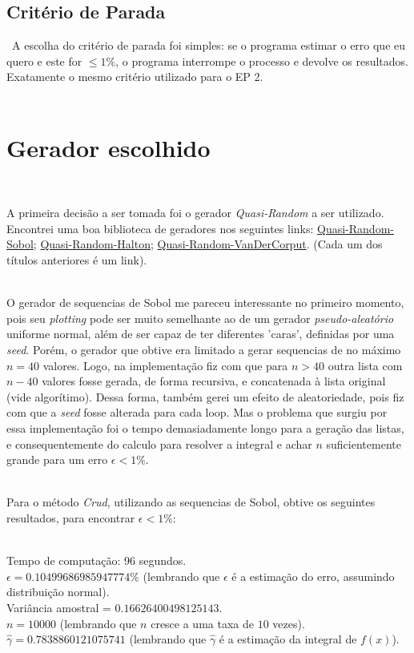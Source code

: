 \documentclass[pt12]{article}
\begin{document}
\subsection{Critério de Parada}
\ 
A escolha do critério de parada foi simples: se o programa estimar o erro que eu quero e este for $\leq 1\%$, o programa interrompe o processo e devolve os resultados. Exatamente o mesmo critério utilizado para o EP 2.\\ 
\ 

\section{Gerador escolhido}
\ 

A primeira decisão a ser tomada foi o gerador \textit{Quasi-Random} a ser utilizado. Encontrei uma boa biblioteca de geradores nos seguintes links: \href{http://people.sc.fsu.edu/~jburkardt/py_src/sobol/sobol.html}{Quasi-Random-Sobol}; \href{http://people.sc.fsu.edu/~jburkardt/py_src/halton/halton.html}{Quasi-Random-Halton}; \href{http://people.sc.fsu.edu/~jburkardt/py_src/van_der_corput/van_der_corput.html}{Quasi-Random-VanDerCorput}. (Cada um dos títulos anteriores é um link).\\
\ 

O gerador de sequencias de Sobol me pareceu interessante no primeiro momento, pois seu \textit{plotting} pode ser muito semelhante ao de um gerador \textit{pseudo-aleatório} uniforme normal, além de ser capaz de ter diferentes 'caras', definidas por uma \textit{seed}. Porém, o gerador que obtive era limitado a gerar sequencias de no máximo $n = 40$ valores. Logo, na implementação fiz com que para $n>40$ outra lista com $n-40$ valores fosse gerada, de forma recursiva, e concatenada à lista original (vide algorítimo). Dessa forma, também gerei um efeito de aleatoriedade, pois fiz com que a \textit{seed} fosse alterada para cada loop. Mas o problema que surgiu por essa implementação foi o tempo demasiadamente longo para a geração das listas, e consequentemente do calculo para resolver a integral e achar $n$ suficientemente grande para um erro $\epsilon < 1\%$.\\
\ 

Para o método \textit{Crud}, utilizando as sequencias de Sobol, obtive os seguintes resultados, para encontrar $\epsilon <1\%$:\\
\ 

\noindent Tempo de computação: $96$ segundos.\\
\noindent $\epsilon = 0.10499686985947774\%$ (lembrando que $\epsilon$ é a estimação do erro, assumindo distribuição normal).\\
\noindent Variância amostral = $0.16626400498125143$.\\
\noindent $n = 10000$ (lembrando que $n$ cresce a uma taxa de $10$ vezes).\\
\noindent $\hat{\gamma} = 0.7838860121075741$ (lembrando que $\hat{\gamma}$ é a estimação da integral de $f(x)$).\\
\ 
\end{document}
